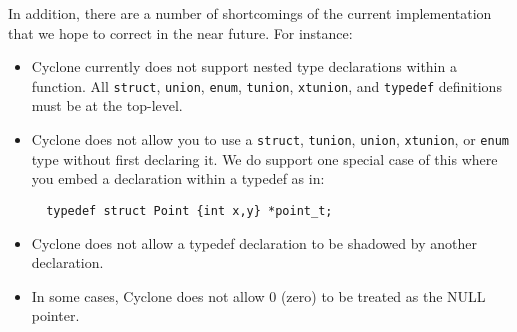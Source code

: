 In addition, there are a number of shortcomings of the current
implementation that we hope to correct in the near future.  For
instance:
\begin{itemize}
\item Cyclone currently does not support nested type declarations
  within a function. All \texttt{struct}, \texttt{union}, \texttt{enum},
  \texttt{tunion}, \texttt{xtunion}, and \texttt{typedef} definitions must
  be at the top-level.

\item Cyclone does not allow you to use a \texttt{struct}, \texttt{tunion},
  \texttt{union}, \texttt{xtunion}, or \texttt{enum} type without first
  declaring it.  We do support one special case of this where you embed
  a declaration within a typedef as in:
\begin{verbatim}
  typedef struct Point {int x,y} *point_t;
\end{verbatim}

\item Cyclone does not allow a typedef declaration to be shadowed by
another declaration.

\item In some cases, Cyclone does not allow 0 (zero) to be treated as 
the NULL pointer.
\end{itemize}


